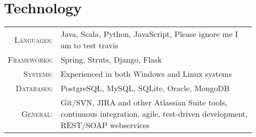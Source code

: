 \section{Technology}

\begin{tabular}{r|p{11cm}}
	\textsc{Languages}: & Java, Scala, Python, JavaScript, Please ignore me I am to test travis \\
	\textsc{Frameworks}: & Spring, Struts, Django, Flask \\
	\textsc{Systems}: & Experienced in both Windows and Linux systems \\
	\textsc{Databases}: & PostgreSQL, MySQL, SQLite, Oracle, MongoDB \\
	\textsc{General}: & Git/SVN, JIRA and other Atlassian Suite tools, continuous integration, agile, test-driven development, REST/SOAP webservices \\
\end{tabular}


